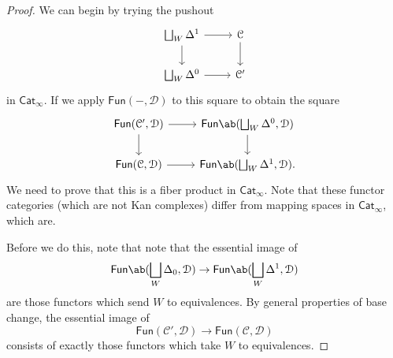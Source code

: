 \documentclass[10pt]{amsart}
\theoremstyle{definition}
\theoremstyle{remark}
\theoremstyle{plain}
\theoremstyle{definition}
\theoremstyle{remark}
\newcommand{\mc}[1]{\mathcal{#1}}
\newcommand{\ms}[1]{\mathsf{#1}}
\newcommand{\1}{\mathbf{1}}
\newcommand{\2}{\mathbf{2}}
\newcommand{\3}{\mathbf{3}}
\begin{document}
\begin{proof}
    We can begin by trying the pushout
    \begin{equation*}
    \begin{tikzcd}
        \bigsqcup_W \Delta^1 \ar{r} \ar{d} & \mc{C} \ar{d} \\
        \bigsqcup_W \Delta^0 \ar{r} & \mc{C}'
    \end{tikzcd}
    \end{equation*}
    in $\ms{Cat}_{\infty}$. If we apply $\ms{Fun}(-, \mc{D})$ to this square to obtain the square
    \begin{equation*}
    \begin{tikzcd}
        \ms{Fun}(\mc{C}', \mc{D}) \ar{r} \ar{d} & \ms{Fun}\ab(\bigsqcup_W \Delta^0, \mc{D}) \ar{d} \\
        \ms{Fun}(\mc{C}, \mc{D}) \ar{r} & \ms{Fun}\ab(\bigsqcup_W \Delta^1, \mc{D}).
    \end{tikzcd}
    \end{equation*}
    We need to prove that this is a fiber product in $\ms{Cat}_{\infty}$. Note that these functor categories (which are not Kan complexes) differ from mapping spaces in $\ms{Cat}_{\infty}$, which are.

    Before we do this, note that note that the essential image of
    \[ \ms{Fun}\ab(\bigsqcup_W \Delta_0, \mc{D}) \to \ms{Fun}\ab(\bigsqcup_{W} \Delta^1, \mc{D}) \]
    are those functors which send $W$ to equivalences. By general properties of base change, the essential image of
    \[ \ms{Fun}(\mc{C}', \mc{D}) \to \ms{Fun}(\mc{C}, \mc{D}) \]
    consists of exactly those functors which take $W$ to equivalences.


\end{proof}
\end{document}
